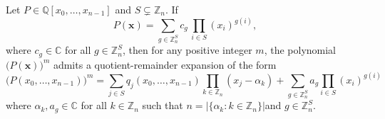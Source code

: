 \begin{lemma} \label{lem:variable-dependency}
Let $P\in\mathbb{Q}\left[x_{0},\ldots,x_{n-1}\right]$
and $S\subsetneq\mathbb{Z}_{n}$. If 
\begin{equation}
P(\mathbf{x})=\sum_{g\in\mathbb{Z}_{n}^{S}}c_{g}\,\prod_{i\in S}(x_{i})^{g(i)},
\end{equation}
where $c_g \in\mathbb{C}$ for all $g\in\mathbb{Z}_{n}^{S}$, then for any positive integer $m$, the polynomial $\big(P(\mathbf{x})\big)^{m}$
admits a quotient-remainder expansion of the form
\begin{equation}
\big(P(x_0,\ldots,x_{n-1})\big)^{m}=\sum_{j\in S}q_{j}(x_0,\ldots,x_{n-1})\prod_{k\in\mathbb{Z}_{n}}(x_{j}-\alpha_{k})+\sum_{g\in\mathbb{Z}_{n}^{S}}a_{g}\prod_{i\in S}(x_{i})^{g(i)}
\end{equation}
where $\alpha_k, a_g\in \mathbb{C}$ for all $k\in \mathbb{Z}_n$ such that $n=\left|\big\{\alpha_{k}:k\in\mathbb{Z}_{n}\big\}\right|$and $g\in\mathbb{Z}_{n}^{S}$.
\end{lemma}
